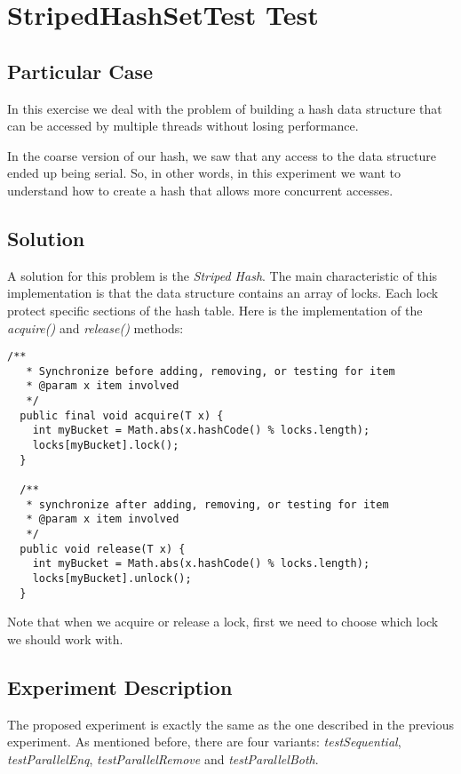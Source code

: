 \section{\textbf{StripedHashSetTest Test}}
\subsection{Particular Case}
\par
In this exercise we deal with the problem of building a hash data structure that
can be accessed by multiple threads without losing performance. 
\par
In the coarse version of our hash, we saw that any access to the data structure
ended up being serial. So, in other words, in this experiment we want to
understand how to create a hash that allows more concurrent accesses.
\par
\subsection{Solution}
\par
A solution for this problem is the \textit{Striped Hash}. The main
characteristic of this implementation is that the data structure contains an
array of locks. Each lock protect specific sections of the hash table. Here is
the implementation of the \textit{acquire()} and \textit{release()} methods:
\par
\hfill
\begin{lstlisting}[style=numbers]
  /**
   * Synchronize before adding, removing, or testing for item
   * @param x item involved
   */
  public final void acquire(T x) {
    int myBucket = Math.abs(x.hashCode() % locks.length);
    locks[myBucket].lock();
  }

  /**
   * synchronize after adding, removing, or testing for item
   * @param x item involved
   */
  public void release(T x) {
    int myBucket = Math.abs(x.hashCode() % locks.length);
    locks[myBucket].unlock();
  }
\end{lstlisting}
\hfill
\par
Note that when we acquire or release a lock, first we need to choose which lock
we should work with. 
\par
\subsection{Experiment Description}
\par
The proposed experiment is exactly the same as the one described in the previous
experiment. As mentioned before, there are four variants:
\textit{testSequential}, \textit{testParallelEnq}, \textit{testParallelRemove}
and \textit{testParallelBoth}.
\par
